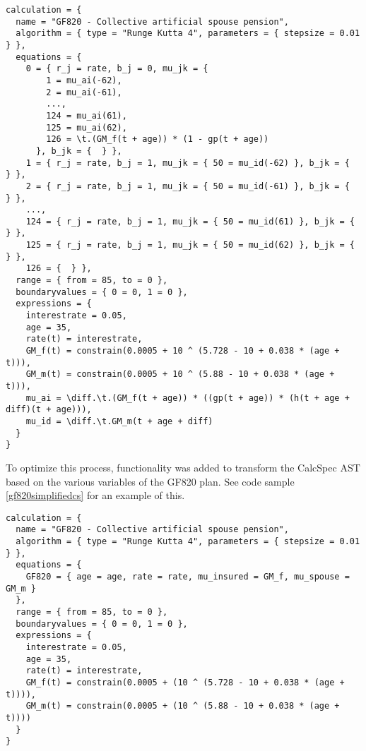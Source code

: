 \begin{lstlisting}[language=calcspec, caption=GF820 CalcSpec, label=gf820cs]
calculation = {
  name = "GF820 - Collective artificial spouse pension", 
  algorithm = { type = "Runge Kutta 4", parameters = { stepsize = 0.01 } }, 
  equations = { 
    0 = { r_j = rate, b_j = 0, mu_jk = { 
        1 = mu_ai(-62), 
        2 = mu_ai(-61), 
        ...,
        124 = mu_ai(61), 
        125 = mu_ai(62), 
        126 = \t.(GM_f(t + age)) * (1 - gp(t + age))
      }, b_jk = {  } }, 
    1 = { r_j = rate, b_j = 1, mu_jk = { 50 = mu_id(-62) }, b_jk = {  } }, 
    2 = { r_j = rate, b_j = 1, mu_jk = { 50 = mu_id(-61) }, b_jk = {  } }, 
    ...,
    124 = { r_j = rate, b_j = 1, mu_jk = { 50 = mu_id(61) }, b_jk = {  } }, 
    125 = { r_j = rate, b_j = 1, mu_jk = { 50 = mu_id(62) }, b_jk = {  } }, 
    126 = {  } }, 
  range = { from = 85, to = 0 }, 
  boundaryvalues = { 0 = 0, 1 = 0 }, 
  expressions = { 
    interestrate = 0.05, 
    age = 35, 
    rate(t) = interestrate, 
    GM_f(t) = constrain(0.0005 + 10 ^ (5.728 - 10 + 0.038 * (age + t))), 
    GM_m(t) = constrain(0.0005 + 10 ^ (5.88 - 10 + 0.038 * (age + t))), 
    mu_ai = \diff.\t.(GM_f(t + age)) * ((gp(t + age)) * (h(t + age + diff)(t + age))), 
    mu_id = \diff.\t.GM_m(t + age + diff) 
  }
}
\end{lstlisting}

To optimize this process, functionality was added to transform the CalcSpec AST based on the various variables of the GF820 plan.
See code sample \ref{gf820simplifiedcs} for an example of this.

\begin{lstlisting}[language=calcspec, caption=GF820 CalcSpec, label=gf820simplifiedcs]
calculation = { 
  name = "GF820 - Collective artificial spouse pension", 
  algorithm = { type = "Runge Kutta 4", parameters = { stepsize = 0.01 } }, 
  equations = { 
    GF820 = { age = age, rate = rate, mu_insured = GM_f, mu_spouse = GM_m }
  }, 
  range = { from = 85, to = 0 }, 
  boundaryvalues = { 0 = 0, 1 = 0 }, 
  expressions = { 
    interestrate = 0.05,
    age = 35,
    rate(t) = interestrate,
    GM_f(t) = constrain(0.0005 + (10 ^ (5.728 - 10 + 0.038 * (age + t)))),
    GM_m(t) = constrain(0.0005 + (10 ^ (5.88 - 10 + 0.038 * (age + t))))
  }
}
\end{lstlisting}

